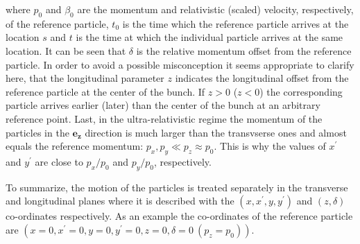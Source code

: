 where $p_0$ and $\beta_0$ are the momentum and relativistic (scaled) velocity, respectively, of the reference particle, $t_0$ is the time  which the reference particle arrives at the location $s$ and $t$ is the time at which the individual particle arrives at the same location. It can be seen that $\delta$ is the relative momentum offset from the reference particle. In order to avoid a possible misconception it seems appropriate to clarify here, that the longitudinal parameter $z$ indicates the longitudinal offset from the reference particle at the center of the bunch. If $z>0$ ($z < 0$) the corresponding particle arrives earlier (later) than the center of the bunch at an arbitrary reference point. Last, in the ultra-relativistic regime the momentum of the particles in the $\mathbf{e_z}$ direction is much larger than the transvserse ones and almost equals the reference momentum: $p_x, p_y \ll p_z \approx p_0$. This is why the values of $x^\prime$ and $y^\prime$ are close to $p_x/p_0$ and $p_y/p_0$, respectively.




To summarize, the motion of the particles is treated separately in the transverse and longitudinal planes where it is described with the  $(x, x^\prime, y, y^\prime)$ and $(z, \delta)$ co-ordinates respectively. As an example the co-ordinates of the reference particle are $(x=0, x^\prime=0, y=0, y^\prime = 0, z=0, \delta=0 \ (p_z=p_0))$.

